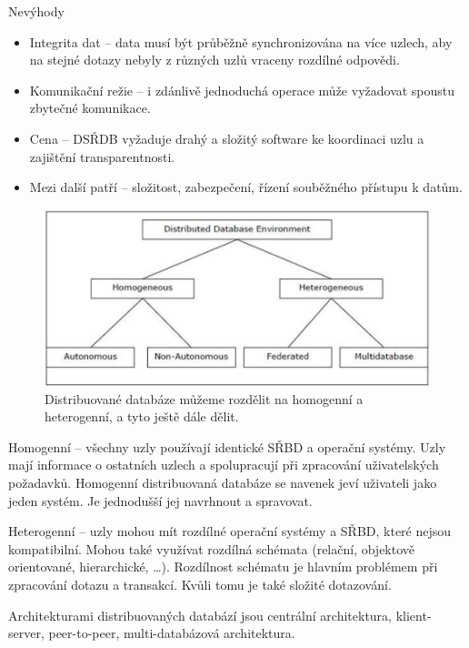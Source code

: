 Nevýhody
\begin{itemize}
\item Integrita dat – data musí být průběžně synchronizována na více uzlech, aby na stejné dotazy nebyly z různých uzlů vraceny rozdílné odpovědi.

\item Komunikační režie – i zdánlivě jednoduchá operace může vyžadovat spoustu zbytečné komunikace.

\item Cena – DSŘDB vyžaduje drahý a složitý software ke koordinaci uzlu a zajištění transparentnosti. \cite{distributedDBMS}

\item Mezi další patří – složitost, zabezpečení, řízení souběžného přístupu k datům.
\end{itemize}

\begin{figure}[!h]
  \centering
  \includegraphics[width=15cm]{template-fig/distributed_database_environments.pdf}
  \caption{Distribuované databáze můžeme rozdělit na homogenní a heterogenní, a tyto ještě dále dělit. \cite{distributedDBMS}}
  \label{FIG_DivDistrDB}
\end{figure}

\noindent Homogenní – všechny uzly používají identické SŘBD a operační systémy. Uzly mají informace o ostatních uzlech a spolupracují při zpracování uživatelských požadavků. Homogenní distribuovaná databáze se navenek jeví uživateli jako jeden systém. Je jednodušší jej navrhnout a spravovat.

Heterogenní – uzly mohou mít rozdílné operační systémy a SŘBD, které nejsou kompatibilní. Mohou také využívat rozdílná schémata (relační, objektově orientované, hierarchické, \ldots). Rozdílnost schématu je hlavním problémem při zpracování dotazu a transakcí. Kvůli tomu je také složité dotazování. \cite{wikiDBMS}

Architekturami distribuovaných databází jsou centrální architektura, klient-server, peer-to-peer, multi-databázová architektura.


